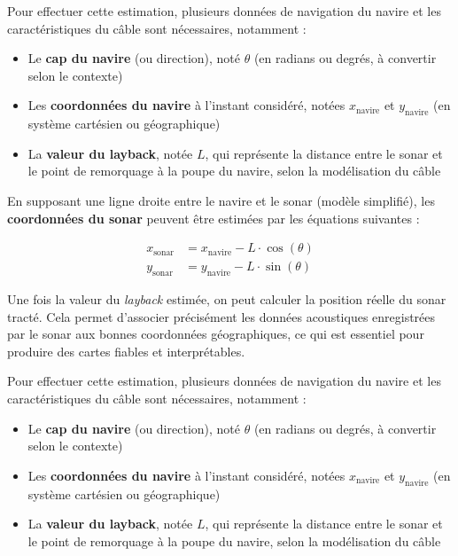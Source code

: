 \documentclass[12pt,a4paper]{report}
\begin{document}
Pour effectuer cette estimation, plusieurs données de navigation du navire et les caractéristiques du câble sont
nécessaires, notamment :

\begin{itemize}
  \item Le \textbf{cap du navire} (ou direction), noté $\theta$ (en radians ou degrés, à convertir selon le contexte)
  \item Les \textbf{coordonnées du navire} à l’instant considéré, notées $x_{\text{navire}}$ et $y_{\text{navire}}$
  (en système cartésien ou géographique)
  \item La \textbf{valeur du layback}, notée $L$, qui représente la distance entre le sonar et le point de remorquage à
  la poupe du navire, selon la modélisation du câble
\end{itemize}

En supposant une ligne droite entre le navire et le sonar (modèle simplifié), les \textbf{coordonnées du sonar} peuvent
être estimées par les équations suivantes :


\begin{align*}
    x_{\text{sonar}} &= x_{\text{navire}} - L \cdot \cos(\theta) \\
    y_{\text{sonar}} &= y_{\text{navire}} - L \cdot \sin(\theta)
\end{align*}


Une fois la valeur du \textit{layback} estimée, on peut calculer la position réelle du sonar tracté. Cela permet d’associer précisément les données acoustiques enregistrées par le sonar aux bonnes coordonnées géographiques, ce qui est essentiel pour produire des cartes fiables et interprétables.

Pour effectuer cette estimation, plusieurs données de navigation du navire et les caractéristiques du câble sont nécessaires, notamment :

\begin{itemize}
  \item Le \textbf{cap du navire} (ou direction), noté $\theta$ (en radians ou degrés, à convertir selon le contexte)
  \item Les \textbf{coordonnées du navire} à l’instant considéré, notées $x_{\text{navire}}$ et $y_{\text{navire}}$ (en système cartésien ou géographique)
  \item La \textbf{valeur du layback}, notée $L$, qui représente la distance entre le sonar et le point de remorquage à la poupe du navire, selon la modélisation du câble
\end{itemize}
\end{document}
